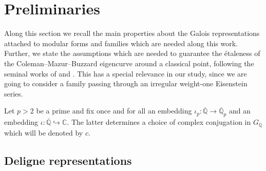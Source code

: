 \documentclass[a4paper,11pt]{amsart}
\theoremstyle{plain}
\theoremstyle{definition}
\theoremstyle{remark}
\newcommand{\bb}{\mathbb}
\numberwithin{equation}{section}
\begin{document}
\section{Preliminaries}

Along this section we recall the main properties about the Galois representations attached to modular forms and families which are needed along this work. Further, we state the assumptions which are needed to guarantee the \'etaleness of the Coleman--Mazur--Buzzard eigencurve around a classical point, following the seminal works of \cite{bellaiche-dimitrov} and \cite{BeDiPo}. This has a special relevance in our study, since we are going to consider a family passing through an irregular weight-one Eisenstein series.

Let $p>2$ be a prime and fix once and for all an embedding $\iota_p:\overline{\bb{Q}}\xrightarrow{} \overline{\bb{Q}}_p$ and an embedding $\iota: \overline{\bb{Q}}\hookrightarrow \bb{C}$. The latter determines a choice of complex conjugation in $G_{\bb{Q}}$ which will be denoted by $c$.

\subsection{Deligne representations}
\end{document}
